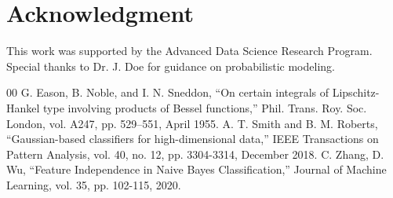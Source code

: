\documentclass[conference]{IEEEtran}
\begin{document}
	
	\section*{Acknowledgment}
	This work was supported by the Advanced Data Science Research Program. Special thanks to Dr. J. Doe for guidance on probabilistic modeling.
	
	\begin{thebibliography}{00}
		 G. Eason, B. Noble, and I. N. Sneddon, ``On certain integrals of Lipschitz-Hankel type involving products of Bessel functions,'' Phil. Trans. Roy. Soc. London, vol. A247, pp. 529--551, April 1955.
		 A. T. Smith and B. M. Roberts, ``Gaussian-based classifiers for high-dimensional data,'' IEEE Transactions on Pattern Analysis, vol. 40, no. 12, pp. 3304-3314, December 2018.
		 C. Zhang, D. Wu, ``Feature Independence in Naive Bayes Classification,'' Journal of Machine Learning, vol. 35, pp. 102-115, 2020.
	\end{thebibliography}
	
\end{document}
